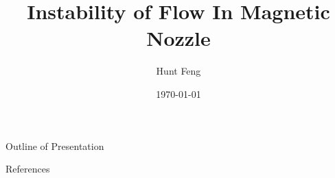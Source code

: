 \documentclass{beamer}
\title{Instability of Flow In Magnetic Nozzle}
\author{Hunt Feng}
\institute{University of Saskatchewan}
\date{\today}
\begin{document}
	\frame{\titlepage}
	\begin{frame}{Outline of Presentation}
		\tableofcontents
	\end{frame}

	
	
	
	
  
  \newpage
  \begin{frame}{References}
    
     
  \end{frame}
\end{document}
